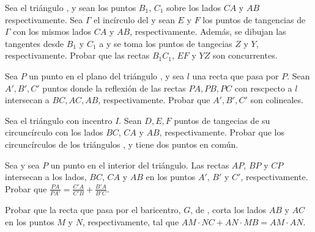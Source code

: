 \begin{section-problem}
    Sea el triángulo , y sean los puntos $B_1$, $C_1$ sobre los lados $CA$ y $AB$ respectivamente.
    Sea $\Gamma$ el incírculo del  y sean $E$ y $F$ los puntos de tangencias de $\Gamma$ con los mismos lados $CA$ y $AB$, respectivamente.
    Además, se dibujan las tangentes desde $B_1$ y $C_1$ a  y se toma los puntos de tangecias $Z$ y $Y$, respectivamente.
    Probar que las rectas $B_1 C_1$, $EF$ y $YZ$ son concurrentes.
\end{section-problem}

\begin{section-problem}
    Sea $P$ un punto en el plano del triángulo , y sea $l$ una recta que pasa por $P$.
    Sean $A', B', C'$ puntos donde la reflexión de las rectas $PA, PB, PC$ con rescpecto a $l$ intersecan a $BC, AC, AB$, respectivamente.
    Probar que $A', B', C'$ son colineales.
\end{section-problem}

\begin{section-problem}
    Sea el triángulo  con incentro $I$.
    Sean $D, E, F$ puntos de tangecias de su circuncírculo con los lados $BC$, $CA$ y $AB$, respectivamente.
    Probar que los circuncírculos de los triángulos ,  y  tiene dos puntos en común.
\end{section-problem}

\begin{section-problem}
    Sea  y sea $P$ un punto en el interior del triángulo.
    Las rectas $AP$, $BP$ y $CP$ intersecan a los lados, $BC$, $CA$ y $AB$ en los puntos $A'$, $B'$ y $C'$, respectivamente.
    Probar que $\frac{PA}{PA'} = \frac{C'A}{C'B} + \frac{B'A}{B'C}$.
\end{section-problem}

\begin{section-problem}
    Probar que la recta que pasa por el baricentro, $G$, de , corta los lados $AB$ y $AC$ en los puntos $M$ y $N$, respectivamente, tal que $AM \cdot NC + AN \cdot MB = AM \cdot AN$.
\end{section-problem}

